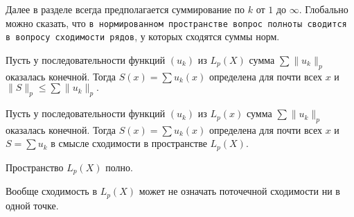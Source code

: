 Далее в разделе всегда предполагается суммирование по $k$ от $1$ до $\infty$. Глобально можно сказать, что \texttt{в нормированном пространстве вопрос полноты сводится в вопросу сходимости рядов}, у которых сходятся суммы норм. 

\begin{to_lem}
    Пусть у последовательности функций $(u_k)$ из $L_p (X)$ сумма
    $\sum \|u_k\|_p$
    оказалась конечной. Тогда $S(x) = \sum u_k (x)$ определена для почти всех $x$ и
    $\|S\|_p \leq \sum \|u_k\|_p.$
\end{to_lem}


\begin{to_lem}
    Пусть у последовательности функций $(u_k)$ из $L_p (x)$ сумма
    $\sum \|u_k\|_p$
    оказалась конечной. Тогда $S(x) = \sum u_k (x)$ определена для почти всех $x$ и
    $S = \sum u_k$
    в смысле сходимости в пространстве $L_p (X)$.
\end{to_lem}


\begin{to_thr}[]
    Пространство $L_p (X)$ полно.
\end{to_thr}



Вообще сходимость в $L_p (X)$ может не означать поточечной сходимости ни в одной точке.